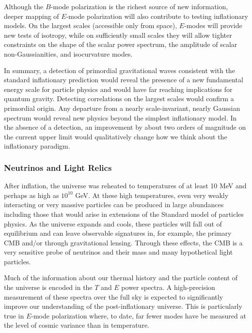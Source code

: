 Although the $B$-mode polarization is the richest source of new information, deeper mapping of $E$-mode polarization will also contribute to testing inflationary models. On the largest scales (accessible only from space), $E$-modes will provide new tests of isotropy, while on sufficiently small scales they will allow tighter constraints on the shape of the scalar power spectrum, the amplitude of scalar non-Gaussianities, and isocurvature modes.  

In summary, a detection of primordial gravitational waves consistent with the standard inflationary prediction would reveal the presence of a new fundamental energy scale for particle physics and would have far reaching implications for quantum gravity. Detecting correlations on the largest scales would confirm a primordial origin. Any departure from a nearly scale-invariant, nearly Gaussian spectrum would reveal new physics beyond the simplest inflationary model. In the absence of a detection, an improvement by about two orders of magnitude on the current upper limit would qualitatively change how we think about the inflationary paradigm.

\vspace{-0.15in}

\subsubsection{Neutrinos and Light Relics}

\vspace{-0.05in}

After inflation, the universe was reheated to temperatures of at least 10 MeV and perhaps as high as $10^{10}$ GeV.  At these high temperatures, even very weakly interacting or very massive particles can be produced in large abundances including those that would arise in extensions of the Standard model of particles physics.  As the universe expands and cools, these particles will fall out of equilibrium and can leave observable signatures in, for example, the primary CMB and/or through gravitational lensing.  Through these effects, the CMB is a very sensitive probe of neutrinos and their mass and many hypothetical light particles.  

Much of the information about our thermal history and the particle content of the universe is encoded in the $T$ and $E$ power spectra.  
A high-precision measurement of these spectra over the full sky is expected to significantly improve our understanding of the post-inflationary 
universe.  This is particularly true in $E$-mode polarization where, to date, far fewer modes have be measured at the level of cosmic variance than in temperature.

